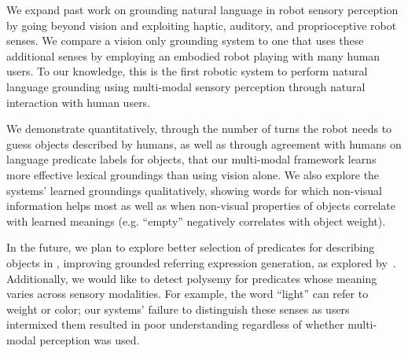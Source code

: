 We expand past work on grounding natural language in robot sensory perception by going beyond vision and exploiting haptic, auditory, and proprioceptive robot senses.
We compare a vision only grounding system to one that uses these additional senses by employing an embodied robot playing \ispy with many human users.
To our knowledge, this is the first robotic system to perform natural language grounding using multi-modal sensory perception through natural interaction with human users.

We demonstrate quantitatively, through the number of turns the robot needs to guess objects described by humans, as well as through agreement with humans on language predicate labels for objects, that our multi-modal framework learns more effective lexical groundings than using vision alone.
We also explore the systems' learned groundings qualitatively, showing words for which non-visual information helps most as well as when non-visual properties of objects correlate with learned meanings (e.g. ``empty'' negatively correlates with object weight).

In the future, we plan to explore better selection of predicates for describing objects in \ispy, improving grounded referring expression generation, as explored by~\cite{tellex:rss14}.
Additionally, we would like to detect polysemy for predicates whose meaning varies across sensory modalities.
For example, the word ``light'' can refer to weight or color; our systems' failure to distinguish these senses as users intermixed them resulted in poor understanding regardless of whether multi-modal perception was used.
